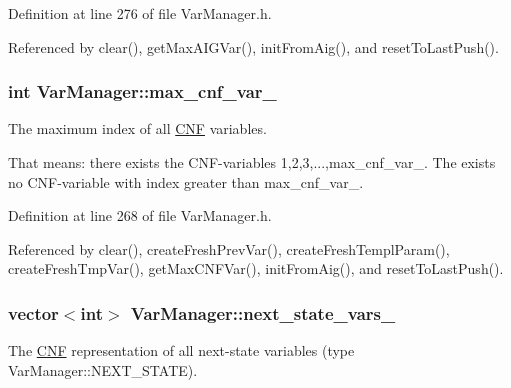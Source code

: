 Definition at line 276 of file Var\-Manager.\-h.



Referenced by clear(), get\-Max\-A\-I\-G\-Var(), init\-From\-Aig(), and reset\-To\-Last\-Push().

\hypertarget{classVarManager_aa790c99974d2aa97ed1848e49c4c82c6}{
\subsubsection[{max\-\_\-cnf\-\_\-var\-\_\-}]{\setlength{\rightskip}{0pt plus 5cm}int Var\-Manager\-::max\-\_\-cnf\-\_\-var\-\_\-\hspace{0.3cm}{\ttfamily [protected]}}}\label{classVarManager_aa790c99974d2aa97ed1848e49c4c82c6}


The maximum index of all \hyperlink{classCNF}{C\-N\-F} variables. 

That means\-: there exists the C\-N\-F-\/variables 1,2,3,...,max\-\_\-cnf\-\_\-var\-\_\-. The exists no C\-N\-F-\/variable with index greater than max\-\_\-cnf\-\_\-var\-\_\-. 

Definition at line 268 of file Var\-Manager.\-h.



Referenced by clear(), create\-Fresh\-Prev\-Var(), create\-Fresh\-Templ\-Param(), create\-Fresh\-Tmp\-Var(), get\-Max\-C\-N\-F\-Var(), init\-From\-Aig(), and reset\-To\-Last\-Push().

\hypertarget{classVarManager_a2a697fcb384c73821d88104ac904f4e9}{
\subsubsection[{next\-\_\-state\-\_\-vars\-\_\-}]{\setlength{\rightskip}{0pt plus 5cm}vector$<$int$>$ Var\-Manager\-::next\-\_\-state\-\_\-vars\-\_\-\hspace{0.3cm}{\ttfamily [protected]}}}\label{classVarManager_a2a697fcb384c73821d88104ac904f4e9}


The \hyperlink{classCNF}{C\-N\-F} representation of all next-\/state variables (type Var\-Manager\-::\-N\-E\-X\-T\-\_\-\-S\-T\-A\-T\-E). 

